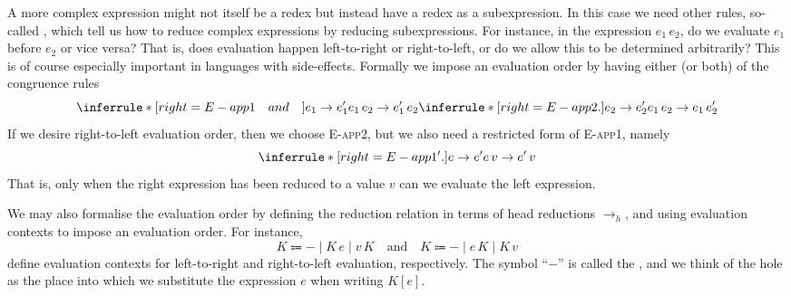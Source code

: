\documentclass[a4paper, 11pt, article, danish, oneside]{memoir}
\newcommand{\infrule}[1]{{\normalfont\textsc{#1}}}
\newcommand{\step}{\to}
\newcommand{\headstep}{\to_h}
\newcommand{\hole}{-}
\begin{document}
A more complex expression might not itself be a redex but instead have a redex as a subexpression. In this case we need other rules, so-called , which tell us how to reduce complex expressions by reducing subexpressions. For instance, in the expression $e_1\,e_2$, do we evaluate $e_1$ before $e_2$ or vice versa? That is, does evaluation happen left-to-right or right-to-left, or do we allow this to be determined arbitrarily? This is of course especially important in languages with side-effects. Formally we impose an evaluation order by having either (or both) of the congruence rules
%
\begin{equation*}
    \inferrule*[right=E-app1 \quad {\normalfont and} \quad]{
        e_1 \step e_1'
    }{
        e_1 \, e_2 \step e_1' \, e_2
    }
    \inferrule*[right=E-app2.]{
        e_2 \step e_2'
    }{
        e_1 \, e_2 \step e_1 \, e_2'
    }
\end{equation*}
%
If we desire right-to-left evaluation order, then we choose \infrule{E-app2}, but we also need a restricted form of \infrule{E-app1}, namely
%
\begin{equation*}
    \inferrule*[right=E-app1'.]{
        e \step e'
    }{
        e \, v \step e' \, v
    }
\end{equation*}
%
That is, only when the right expression has been reduced to a value $v$ can we evaluate the left expression.

We may also formalise the evaluation order by defining the reduction relation in terms of head reductions $\headstep$, and using evaluation contexts to impose an evaluation order. For instance,
%
\begin{equation*}
    K \Coloneqq \hole \mid K \, e \mid v \, K
    \quad \text{and} \quad
    K \Coloneqq \hole \mid e \, K \mid K \, v
\end{equation*}
%
define evaluation contexts for left-to-right and right-to-left evaluation, respectively. The symbol \enquote{$\hole$} is called the , and we think of the hole as the place into which we substitute the expression $e$ when writing $K[e]$.
\end{document}
